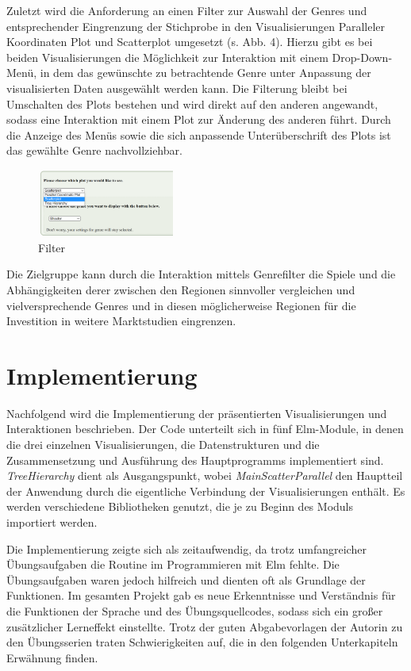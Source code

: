 \documentclass[usegeometry=true]{scrartcl}
\begin{document}
Zuletzt wird die Anforderung an einen Filter zur Auswahl der Genres und entsprechender Eingrenzung der Stichprobe in den Visualisierungen Paralleler Koordinaten Plot und Scatterplot umgesetzt (s. Abb. 4).
Hierzu gibt es bei beiden Visualisierungen die Möglichkeit zur Interaktion mit einem Drop-Down-Menü, 
in dem das gewünschte zu betrachtende Genre unter Anpassung der visualisierten Daten ausgewählt werden kann.
Die Filterung bleibt bei Umschalten des Plots bestehen und wird direkt auf den anderen angewandt, 
sodass eine Interaktion mit einem Plot zur Änderung des anderen führt. 
Durch die Anzeige des Menüs sowie die sich anpassende Unterüberschrift des Plots ist das gewählte Genre nachvollziehbar.
\begin{figure}
        \includegraphics[width=4.5cm]{Bilder/filters_global.png}
        \caption{Filter}
        \label{fig:Filter}
\end{figure}
Die Zielgruppe kann durch die Interaktion mittels Genrefilter die Spiele und die Abhängigkeiten derer zwischen den Regionen sinnvoller vergleichen 
und vielversprechende Genres und in diesen möglicherweise Regionen für die Investition in weitere Marktstudien eingrenzen.

\section{Implementierung}
Nachfolgend wird die Implementierung der präsentierten Visualisierungen und Interaktionen beschrieben. 
Der Code unterteilt sich in fünf Elm-Module, in denen die drei einzelnen Visualisierungen, die Datenstrukturen 
und die Zusammensetzung und Ausführung des Hauptprogramms implementiert sind. 
\textit{TreeHierarchy} dient als Ausgangspunkt, wobei \textit{MainScatterParallel} den Hauptteil der Anwendung durch die eigentliche Verbindung 
der Visualisierungen enthält.
Es werden verschiedene Bibliotheken genutzt, die je zu Beginn des Moduls importiert werden.
           
Die Implementierung zeigte sich als zeitaufwendig, da trotz umfangreicher Übungsaufgaben die Routine im Programmieren mit Elm fehlte.
Die Übungsaufgaben waren jedoch hilfreich und dienten oft als Grundlage der Funktionen.
Im gesamten Projekt gab es neue Erkenntnisse und Verständnis für die Funktionen der Sprache und des Übungsquellcodes, 
sodass sich ein großer zusätzlicher Lerneffekt einstellte.
Trotz der guten Abgabevorlagen der Autorin zu den Übungsserien traten Schwierigkeiten auf, 
die in den folgenden Unterkapiteln Erwähnung finden.
          
\end{document}
